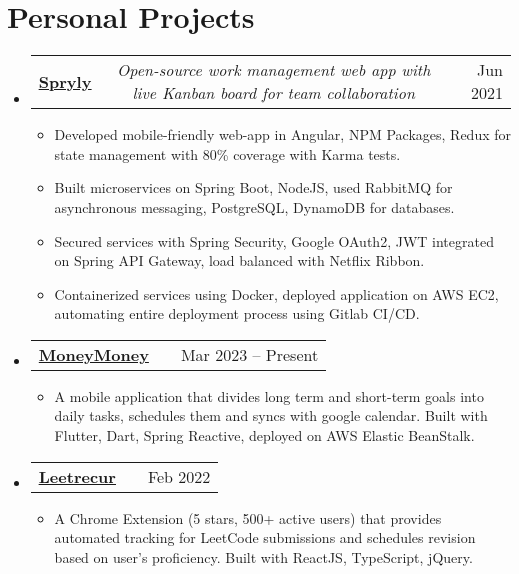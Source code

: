 \documentclass[a4paper,10pt]{article}
\makeatletter
\newcommand{\resumeItem}[1]{
  \item\small{#1}
}
\newcommand{\resumeItemListStart}{\begin{itemize}[rightmargin=0.11in]}
\newcommand{\resumeItemListEnd}{\end{itemize}}
\newcommand{\resumeTrioHeading}[3]{
  \item\small{
    \begin{tabular*}{0.96\textwidth}[t]{
      l@{\extracolsep{\fill}}c@{\extracolsep{\fill}}r
    }
      \textbf{#1} & \textit{#2} & #3
    \end{tabular*}
  }
}
\newcommand{\resumeHeadingListStart}{
  \begin{itemize}[leftmargin=0.15in, label={}]
}
\newcommand{\resumeHeadingListEnd}{\end{itemize}}
\makeatother
\begin{document}
\vspace{-0.8\baselineskip}



\section{Personal Projects}
  \resumeHeadingListStart{}
    \resumeTrioHeading{\href{https://spryly.namanshrimali.com}{\uline{Spryly}}}{Open-source work management web app with live Kanban board for team collaboration}{Jun 2021}
      \resumeItemListStart{}
        \resumeItem{Developed mobile-friendly web-app in Angular, NPM Packages, Redux for state management with 80\% coverage with Karma tests.}
        \resumeItem{Built microservices on Spring Boot, NodeJS, used RabbitMQ for asynchronous messaging, PostgreSQL, DynamoDB for databases.}
        \resumeItem{Secured services with Spring Security, Google OAuth2, JWT integrated on Spring API Gateway, load balanced with Netflix Ribbon.}
        \resumeItem{Containerized services using Docker, deployed application on AWS EC2, automating entire deployment process using Gitlab CI/CD.}
      \resumeItemListEnd{}

      \resumeTrioHeading{\uline{MoneyMoney}}{}{Mar 2023 -- Present}
      \resumeItemListStart{}
        \resumeItem{A mobile application that divides long term and short-term goals into daily tasks, schedules them and syncs
        with google calendar. Built with Flutter, Dart, Spring Reactive, deployed on AWS Elastic BeanStalk.}
      \resumeItemListEnd{}

      \resumeTrioHeading{\href{https://leetrecur.com}{\uline{Leetrecur}}}{}{Feb 2022}
      \resumeItemListStart{}
        \resumeItem{A Chrome Extension (5 stars, 500+ active users) that provides automated tracking for LeetCode
        submissions and schedules revision based on user’s proficiency. Built with ReactJS, TypeScript, jQuery.}
      \resumeItemListEnd{}
  \resumeHeadingListEnd{}
\vspace{-0.8\baselineskip}

\end{document}
